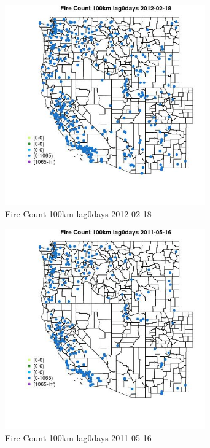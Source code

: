 \begin{figure} 
\centering  
\includegraphics[width=0.77\textwidth]{Code_Outputs/Report_ML_input_PM25_Step4_part_f_de_duplicated_aveswNAs_MapObsFire_Count_100km_lag0days2012-02-18.jpg} 
\caption{\label{fig:Report_ML_input_PM25_Step4_part_f_de_duplicated_aveswNAsMapObsFire_Count_100km_lag0days2012-02-18}Fire Count 100km lag0days 2012-02-18} 
\end{figure} 
 

\begin{figure} 
\centering  
\includegraphics[width=0.77\textwidth]{Code_Outputs/Report_ML_input_PM25_Step4_part_f_de_duplicated_aveswNAs_MapObsFire_Count_100km_lag0days2011-05-16.jpg} 
\caption{\label{fig:Report_ML_input_PM25_Step4_part_f_de_duplicated_aveswNAsMapObsFire_Count_100km_lag0days2011-05-16}Fire Count 100km lag0days 2011-05-16} 
\end{figure} 
 

